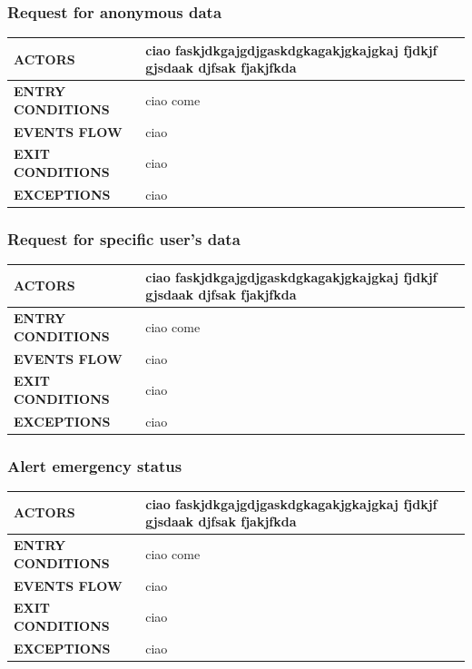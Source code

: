 \documentclass[a4paper]{article}
\begin{document}
\vspace{1cm}

\subsubsection{Request for anonymous data}
\begin{center}
    \begin{tabular}{l || p{8cm} ||}
        \bf{ACTORS} & ciao faskjdkgajgdjgaskdgkagakjgkajgkaj fjdkjf gjsdaak djfsak fjakjfkda \\ \hline
        \bf{ENTRY CONDITIONS} & ciao come  \\ \hline
        \bf{EVENTS FLOW} & ciao\\ \hline
        \bf{EXIT CONDITIONS} & ciao\\ \hline
        \bf{EXCEPTIONS} & ciao\\ \hline \hline
    \end{tabular}
\end{center}

\vspace{1cm}

\subsubsection{Request for specific user's data}
\begin{center}
    \begin{tabular}{l || p{8cm} ||}
        \bf{ACTORS} & ciao faskjdkgajgdjgaskdgkagakjgkajgkaj fjdkjf gjsdaak djfsak fjakjfkda \\ \hline
        \bf{ENTRY CONDITIONS} & ciao come  \\ \hline
        \bf{EVENTS FLOW} & ciao\\ \hline
        \bf{EXIT CONDITIONS} & ciao\\ \hline
        \bf{EXCEPTIONS} & ciao\\ \hline \hline
    \end{tabular}
\end{center}

\vspace{1cm}

\subsubsection{Alert emergency status}
\begin{center}
    \begin{tabular}{l || p{8cm} ||}
        \bf{ACTORS} & ciao faskjdkgajgdjgaskdgkagakjgkajgkaj fjdkjf gjsdaak djfsak fjakjfkda \\ \hline
        \bf{ENTRY CONDITIONS} & ciao come  \\ \hline
        \bf{EVENTS FLOW} & ciao\\ \hline
        \bf{EXIT CONDITIONS} & ciao\\ \hline
        \bf{EXCEPTIONS} & ciao\\ \hline \hline
    \end{tabular}
\end{center}
\end{document}
